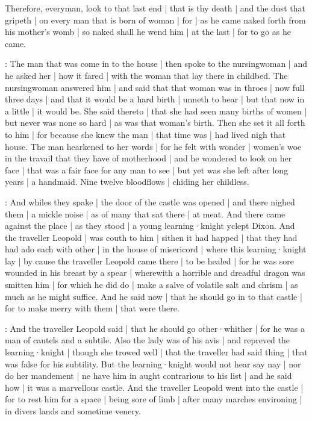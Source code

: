 

Therefore,
everyman,
look to that last end |
that is thy death |
and the dust that gripeth |
on every man that is born of woman |
for |
as he came naked forth from his mother's womb |
so naked shall he wend him |
at the last |
for to go as he came.


:
The man that was come in to the house |
then spoke to the nursingwoman |
and he asked her |
how it fared |
with the woman that lay there in childbed.
The nursingwoman answered him |
and said that that woman was in throes |
now full three days |
and that it would be a hard birth |
unneth to bear |
but that now in a little |
it would be.
She said thereto |
that she had seen many births of women |
but never was none so hard |
as was that woman's birth.
Then she set it all forth to him |
for because she knew the man |
that time was |
had lived nigh that house.
The man hearkened to her words |
for he felt with wonder |
women's woe in the travail that they have of motherhood |
and he wondered to look on her face |
that was a fair face for any man to see |
but yet was she left after long years |
a handmaid.
Nine twelve bloodflows |
chiding her childless.



:
And whiles they spake |
the door of the castle was opened |
and there nighed them |
a mickle noise |
as of many that sat there |
at meat.
And there came against the place |
as they stood |
a young learning·knight yclept Dixon.
And the traveller Leopold |
was couth to him |
sithen it had happed |
that they had had ado each with other |
in the house of misericord |
where this learning·knight lay |
by cause the traveller Leopold came there |
to be healed |
for he was sore wounded in his breast by a spear |
wherewith a horrible and dreadful dragon was smitten him |
for which he did do |
make a salve of volatile salt and chrism |
as much as he might suffice.
And he said now |
that he should go in to that castle |
for to make merry with them |
that were there.

:
And the traveller Leopold said |
that he should go other·whither |
for he was a man of cautels and a subtile.
Also the lady was of his avis |
and repreved the learning·knight |
though she trowed well |
that the traveller had said thing |
that was false for his subtility.
But the learning·knight would not hear say nay |
nor do her mandement |
ne have him in aught contrarious to his list |
and he said how |
it was a marvellous castle.
And the traveller Leopold went into the castle |
for to rest him for a space |
being sore of limb |
after many marches environing |
in divers lands and sometime venery.

